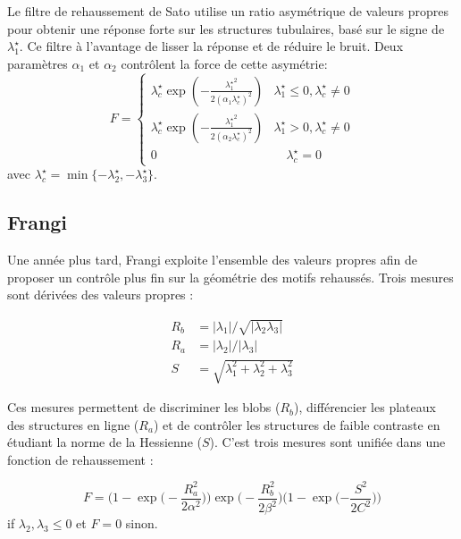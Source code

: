 Le filtre de rehaussement de Sato utilise un ratio asymétrique de valeurs propres pour obtenir une réponse forte sur les structures tubulaires, basé sur le signe de $\lambda^\star_1$.
Ce filtre à l'avantage de lisser la réponse et de réduire le bruit. Deux paramètres $\alpha_1$ et $\alpha_2$ contrôlent la force de cette asymétrie:
\begin{equation}
\nonumber
F =
\left\{
\begin{array}{lr}
\lambda^\star_c \exp(-\frac{{\lambda^\star_1}^2}{2(\alpha_1 \lambda^\star_c)^2})  & \lambda^\star_1 \leqslant 0, \lambda^\star_c \neq 0 \\
\lambda^\star_c \exp(-\frac{{\lambda^\star_1}^2}{2(\alpha_2\lambda^\star_c)^2})  &  \lambda^\star_1 > 0, \lambda^\star_c \neq 0 \\
0 & \quad \lambda^\star_c = 0
\end{array}
\right.
\end{equation}
avec $\lambda^\star_c = \min\{-\lambda^\star_2,-\lambda^\star_3\}$.

\subsection{Frangi}

Une année plus tard, Frangi \etal \cite{Frangi1998_vesselness} exploite l'ensemble des valeurs propres afin de proposer un contrôle plus fin sur la géométrie des motifs rehaussés. Trois mesures sont dérivées des valeurs propres :

\begin{align}
 \nonumber
  R_b & = |\lambda_1| / \sqrt{|\lambda_2\lambda_3|}\\
R_a & = |\lambda_2| / |\lambda_3| \nonumber\\
S & = \sqrt{\lambda^2_1 + \lambda^2_2 + \lambda^2_3} \nonumber
\end{align}

Ces mesures permettent de discriminer les blobs ($R_b$), différencier les plateaux des structures en ligne ($R_a$) et de contrôler les structures de faible contraste en étudiant la norme de la Hessienne ($S$). C'est trois mesures sont unifiée dans une fonction de rehaussement :   

\begin{equation}
\nonumber
  F =
   \big(1-\exp\big(-\frac{R_a^2}{2\alpha^2}\big)\big) \exp\big(-\frac{R_b^2}{2\beta^2}\big)\big(1-\exp(-\frac{S^2}{2C^2}\big)\big)
\end{equation}
if $\lambda_2, \lambda_3 \leqslant 0$ et $F = 0$ sinon.

